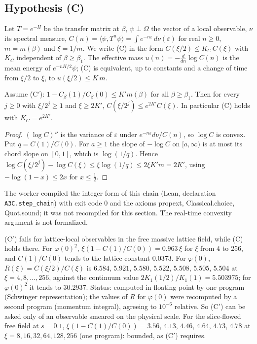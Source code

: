 \subsection{Hypothesis (C)}

Let $T=e^{-H}$ be the transfer matrix at $\beta$, $\psi\perp\Omega$ the vector of a local
observable, $\nu$ its spectral measure, $C(n)=\langle\psi,T^n\psi\rangle=\int e^{-n\varepsilon}\,d\nu(\varepsilon)$
for real $n\ge0$, $m=m(\beta)$ and $\xi=1/m$. We write (C) in the form
$C(\xi/2)\le K_C\,C(\xi)$ with $K_C$ independent of $\beta\ge\beta_1$. The effective mass
$u(n)=-\frac{d}{dn}\log C(n)$ is the mean energy of $e^{-nH/2}\psi$; (C) is equivalent, up to
constants and a change of time from $\xi/2$ to $\xi$, to $u(\xi/2)\le K\,m$.

\begin{proposition}\label{neg:prop-Cprime}
Assume \textup{(C$'$)}: $1-C_\beta(1)/C_\beta(0)\le K'm(\beta)$ for all $\beta\ge\beta_1$. Then for
every $j\ge0$ with $\xi/2^j\ge1$ and $\xi\ge2K'$,
$C(\xi/2^j)\le e^{2K'}C(\xi)$. In particular (C) holds with $K_C=e^{2K'}$.
\end{proposition}

\begin{proof}
$(\log C)''$ is the variance of $\varepsilon$ under $e^{-n\varepsilon}d\nu/C(n)$, so $\log C$ is
convex. Put $q=C(1)/C(0)$. For $a\ge1$ the slope of $-\log C$ on $[a,\infty)$ is at most its
chord slope on $[0,1]$, which is $\log(1/q)$. Hence
$\log C(\xi/2^j)-\log C(\xi)\le\xi\log(1/q)\le2\xi K'm=2K'$, using $-\log(1-x)\le2x$ for
$x\le\frac12$.
\end{proof}

The worker compiled the integer form of this chain (Lean, declaration \texttt{A3C.step\_chain})
with exit code $0$ and the axioms propext, Classical.choice, Quot.sound; it was not recompiled
for this section. The real-time convexity argument is not formalized.

\begin{observation}\label{neg:obs-Cprime-free}
(C$'$) fails for lattice-local observables in the free massive lattice field, while (C) holds
there. For $\varphi(0)^2$, $\xi(1-C(1)/C(0))=0.963\,\xi$ for $\xi$ from $4$ to $256$, and $C(1)/C(0)$
tends to the lattice constant $0.0373$. For $\varphi(0)$, $R(\xi)=C(\xi/2)/C(\xi)$ is $6.584$,
$5.921$, $5.580$, $5.522$, $5.508$, $5.505$, $5.504$ at $\xi=4,8,\dots,256$, against the continuum
value $2K_1(1/2)/K_1(1)=5.503975$; for $\varphi(0)^2$ it tends to $30.2937$. Status: computed in
floating point by one program (Schwinger representation); the values of $R$ for $\varphi(0)$ were
recomputed by a second program (momentum integral), agreeing to $10^{-6}$ relative. So (C$'$)
can be asked only of an observable smeared on the physical scale. For the slice-flowed free
field at $s=0.1$, $\xi(1-C(1)/C(0))=3.56$, $4.13$, $4.46$, $4.64$, $4.73$, $4.78$ at
$\xi=8,16,32,64,128,256$ (one program): bounded, as (C$'$) requires.
\end{observation}

